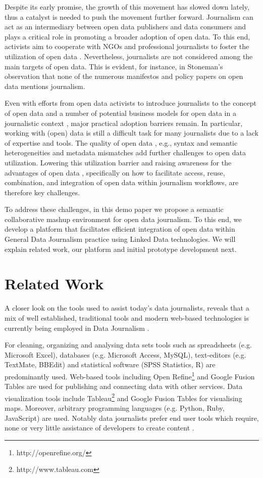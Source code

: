 \documentclass[runningheads,a4paper]{llncs}
\begin{document}
Despite its early promise, the growth of this movement has slowed down lately, thus a catalyst is needed to push the movement further forward. Journalism can act as an intermediary between open data publishers and data consumers and plays a critical role in promoting a broader adoption of open data. To this end, activists aim to cooperate with NGOs and professional journalists to foster the utilization of open data  \cite{_Ref490833618}. Nevertheless, journalists are not considered among the main targets of open data. This is evident, for instance, in Stoneman's observation  \cite{_Ref490833952} that none of the numerous manifestos and policy papers on open data mentions journalism.

Even with efforts from open data activists to introduce journalists to the concept of open data and a number of potential business models for open data in a journalistic context  \cite{_Ref490833966}, major practical adoption barriers remain. In particular, working with (open) data is still a difficult task for many journalists due to a lack of expertise and tools. The quality of open data  \cite{_Ref490833980} \cite{_Ref490833994}, e.g., syntax and semantic heterogeneities and metadata mismatches add further challenges to open data utilization. Lowering this utilization barrier and raising awareness for the advantages of open data  \cite{_Ref490834005}, specifically on how to facilitate access, reuse, combination, and integration of open data within journalism workflows, are therefore key challenges. 

To address these challenges, in this demo paper we propose a semantic collaborative mashup environment for open data journalism. To this end, we develop a platform that facilitates efficient integration of open data within General Data Journalism practice using Linked Data technologies. We will explain related work, our platform and initial prototype development next.

\section{Related Work}

A closer look on the tools used to assist today's data journalists, reveals that a mix of well established, traditional tools and modern web-based technologies is currently being employed in Data Journalism  \cite{_Ref490834005}.

For cleaning, organizing and analysing data sets tools such as spreadsheets (e.g. Microsoft Excel), databases (e.g. Microsoft Access, MySQL), text-editors (e.g. TextMate, BBEdit) and statistical software (SPSS Statistics, R) are predominantly used. Web-based tools including Open Refine\footnote{ http://openrefine.org/ } and Google Fusion Tables are used for publishing and connecting data with other services. Data visualization tools include Tableau\footnote{ http://www.tableau.com} and Google Fusion Tables for visualising maps. Moreover, arbitrary programming languages (e.g. Python, Ruby, JavaScript) are used. Notably data journalists prefer end user tools which require, none or very little assistance of developers to create content  \cite{_Ref490834005}.
\end{document}
